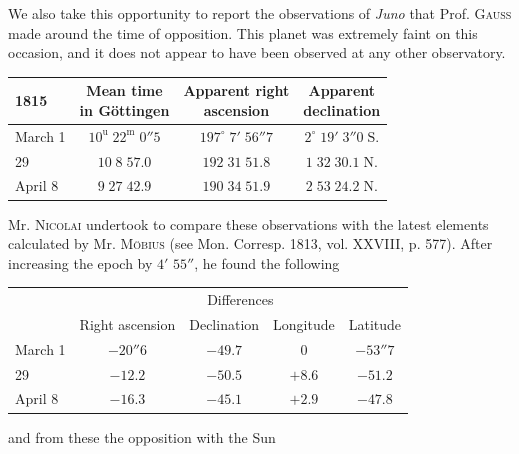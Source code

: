 \par\indent We also take this opportunity to report the observations of \emph{Juno} that Prof. \textsc{Gauss} made around the time of opposition. This planet was extremely faint on this occasion, and it does not appear to have been observed at any other observatory.

\begin{center}\fontsize{10}{12}\selectfont\setlength{\tabcolsep}{5pt}\renewcommand{\arraystretch}{1.15}\begin{tabular}{l|c|c|c}
1815 & \shortstack{Mean time\\in Göttingen} & \shortstack{Apparent right\\ascension} & \shortstack{Apparent\\declination}\\\hline
March 1 & $10^{\mathrm u}\;22^{\mathrm m}\;0''5$ & $197^\circ\;7'\;56''7$ & $2^\circ\;19'\;3''0\;\mathrm{S.}$\\
29 & $10\;8\;57.0$ & $192\;31\;51.8$ & $1\;32\;30.1\;\mathrm{N.}$\\
April 8 & $9\;27\;42.9$ & $190\;34\;51.9$ & $2\;53\;24.2\;\mathrm{N.}$\\
\end{tabular}\end{center}

\par\indent Mr. \textsc{Nicolai} undertook to compare these observations with the latest elements calculated by Mr. \textsc{Möbius} (see Mon. Corresp. 1813, vol. XXVIII, p. 577). After increasing the epoch by $4'$ $55''$, he found the following

\begin{center}
\fontsize{10}{12}\selectfont\setlength{\tabcolsep}{6pt}\renewcommand{\arraystretch}{1.15}\begin{tabular}{l | c | c | c | c}
& \multicolumn{4}{c}{Differences} \\
& Right ascension & Declination & Longitude & Latitude \\
\hline
March 1 & $-20''6$ & $-49.7$ & $0$ & $-53''7$ \\
29 & $-12.2$ & $-50.5$ & $+8.6$ & $-51.2$ \\
April 8 & $-16.3$ & $-45.1$ & $+2.9$ & $-47.8$ \\
\end{tabular}
\end{center}

\noindent and from these the opposition with the Sun

